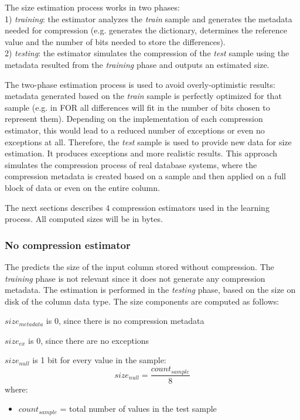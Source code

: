 The size estimation process works in two phases:\\
1) \textit{training}: the estimator analyzes the \textit{train} sample and generates the metadata needed for compression (e.g.  generates the dictionary,  determines the reference value and the number of bits needed to store the differences).\\
2) \textit{testing}: the estimator simulates the compression of the \textit{test} sample using the metadata resulted from the \emph{training} phase and outputs an estimated size.

The two-phase estimation process is used to avoid overly-optimistic results: metadata generated based on the \emph{train} sample is perfectly optimized for that sample (e.g. in FOR all differences will fit in the number of bits chosen to represent them). Depending on the implementation of each compression estimator, this would lead to a reduced number of exceptions or even no exceptions at all. Therefore, the \textit{test} sample is used to provide new data for size estimation. It produces exceptions and more realistic results. This approach simulates the compression process of real database systems, where the compression metadata is created based on a sample and then applied on a full block of data or even on the entire column.

The next sections describes 4 compression estimators used in the learning process. All computed sizes will be in bytes.



\subsubsection{No compression estimator}
\label{subsub:estimator:nocompression}

The  predicts the size of the input column stored without compression. The \textit{training} phase is not relevant since it does not generate any compression metadata. The estimation is performed in the \textit{testing} phase, based on the size on disk of the column data type. The size components are computed as follows:

\(size_{metadata}\) is 0, since there is no compression metadata

\(size_{ex}\) is 0, since there are no exceptions

\(size_{null}\) is 1 bit for every value in the sample: 
\begin{equation}
\label{eq:estimators:nocompression:sizenull}
size_{null} = \frac{count_{sample}}{8}
\end{equation}
where:
\begin{itemize}
    \item[] \(count_{sample}\) = total number of values in the test sample
\end{itemize}

